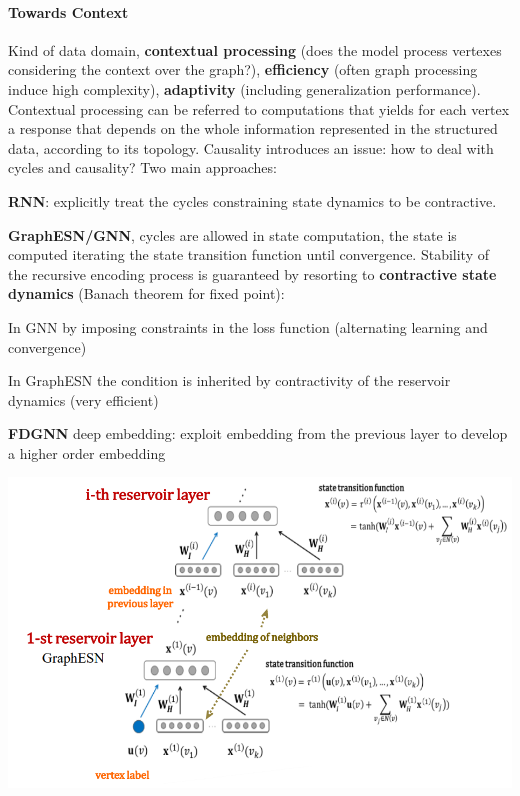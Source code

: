 \documentclass[10pt]{report}
\begin{document}
\paragraph{Towards Context} Kind of data domain, \textbf{contextual processing} (does the model process vertexes considering the context over the graph?), \textbf{efficiency} (often graph processing induce high complexity), \textbf{adaptivity} (including generalization performance).\\
Contextual processing can be referred to computations that yields for each vertex a response that depends on the whole information represented in the structured data, according to its topology. Causality introduces an issue: how to deal with cycles and causality? Two main approaches:
\begin{list}{}{}
	\item \textbf{RNN}: explicitly treat the cycles constraining state dynamics to be contractive.\begin{list}{}{}
		\item \textbf{GraphESN/GNN}, cycles are allowed in state computation, the state is computed iterating the state transition function until convergence. Stability of the recursive encoding process is guaranteed by resorting to \textbf{contractive state dynamics} (Banach theorem for fixed point):
		\begin{list}{}{}
			\item In GNN by imposing constraints in the loss function (alternating learning and convergence)
			\item In GraphESN the condition is inherited by contractivity of the reservoir dynamics (very efficient)
		\end{list}
		\item \textbf{FDGNN} deep embedding: exploit embedding from the previous layer to develop a higher order embedding\begin{center}
			\includegraphics[scale=0.5]{47.png}

\end{center}
\end{list}
\end{list}
\end{document}
